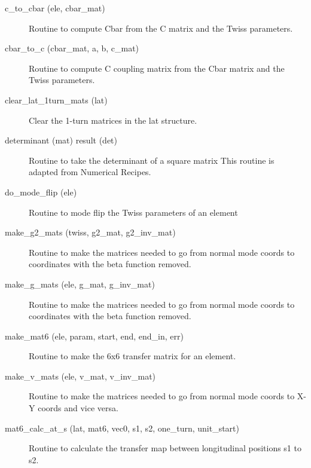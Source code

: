 \begin{description}

\label{r:c.to.cbar}
\item[c_to_cbar (ele, cbar_mat)] \Newline
Routine to compute Cbar from the C matrix and the Twiss parameters. 

\label{r:cbar.to.c}
\item[cbar_to_c (cbar_mat, a, b, c_mat)] \Newline
Routine to compute C coupling matrix from the Cbar matrix and the Twiss parameters. 

\label{r:clear.lat.1turn.mats}
\item[clear_lat_1turn_mats (lat)] \Newline
Clear the 1-turn matrices in the lat structure. 

\label{r:determinant}
\item[determinant (mat) result (det)] \Newline 
Routine to take the determinant of a square matrix
This routine is adapted from Numerical Recipes.

\label{r:do.mode.flip}
\item[do_mode_flip (ele)] \Newline
Routine to mode flip the Twiss parameters of an element 

\label{r:make.g2.mats}
\item[make_g2_mats (twiss, g2_mat, g2_inv_mat)] \Newline
Routine to make the matrices needed to go from normal mode coords to 
coordinates with the beta function removed. 

\label{r:make.g.mats}
\item[make_g_mats (ele, g_mat, g_inv_mat)] \Newline
Routine to make the matrices needed to go from normal mode coords to 
coordinates with the beta function removed. 

\label{r:make.mat6}
\item[make_mat6 (ele, param, start, end, end_in, err)] \Newline
Routine to make the 6x6 transfer matrix for an element. 

\label{r:make.v.mats}
\item[make_v_mats (ele, v_mat, v_inv_mat)] \Newline
Routine to make the matrices needed to go from normal mode coords to X-Y 
coords and vice versa. 

\label{r:mat6.calc.at.s}
\item[mat6_calc_at_s (lat, mat6, vec0, s1, s2, one_turn, unit_start)] \Newline 
Routine to calculate the transfer map between longitudinal positions
s1 to s2.


\end{description}
